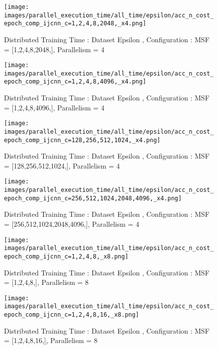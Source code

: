 \begin{figure*}[htbp]
\centering
\texttt{[image: images/parallel\_execution\_time/all\_time/epsilon/acc\_n\_cost\_epoch\_comp\_ijcnn\_c=1,2,4,8,2048,\_x4.png]}
\caption{Distributed Training Time : Dataset Epsilon , Configuration : MSF = [1,2,4,8,2048,], Parallelism = 4}
\label{fig:dis-msf-tr-time-epsilon-x4}
\end{figure*}


\begin{figure*}[htbp]
\centering
\texttt{[image: images/parallel\_execution\_time/all\_time/epsilon/acc\_n\_cost\_epoch\_comp\_ijcnn\_c=1,2,4,8,4096,\_x4.png]}
\caption{Distributed Training Time : Dataset Epsilon , Configuration : MSF = [1,2,4,8,4096,], Parallelism = 4}
\label{fig:dis-msf-tr-time-epsilon-x4}
\end{figure*}


\begin{figure*}[htbp]
\centering
\texttt{[image: images/parallel\_execution\_time/all\_time/epsilon/acc\_n\_cost\_epoch\_comp\_ijcnn\_c=128,256,512,1024,\_x4.png]}
\caption{Distributed Training Time : Dataset Epsilon , Configuration : MSF = [128,256,512,1024,], Parallelism = 4}
\label{fig:dis-msf-tr-time-epsilon-x4}
\end{figure*}


\begin{figure*}[htbp]
\centering
\texttt{[image: images/parallel\_execution\_time/all\_time/epsilon/acc\_n\_cost\_epoch\_comp\_ijcnn\_c=256,512,1024,2048,4096,\_x4.png]}
\caption{Distributed Training Time : Dataset Epsilon , Configuration : MSF = [256,512,1024,2048,4096,], Parallelism = 4}
\label{fig:dis-msf-tr-time-epsilon-x4}
\end{figure*}


\begin{figure*}[htbp]
\centering
\texttt{[image: images/parallel\_execution\_time/all\_time/epsilon/acc\_n\_cost\_epoch\_comp\_ijcnn\_c=1,2,4,8,\_x8.png]}
\caption{Distributed Training Time : Dataset Epsilon , Configuration : MSF = [1,2,4,8,], Parallelism = 8}
\label{fig:dis-msf-tr-time-epsilon-x8}
\end{figure*}


\begin{figure*}[htbp]
\centering
\texttt{[image: images/parallel\_execution\_time/all\_time/epsilon/acc\_n\_cost\_epoch\_comp\_ijcnn\_c=1,2,4,8,16,\_x8.png]}
\caption{Distributed Training Time : Dataset Epsilon , Configuration : MSF = [1,2,4,8,16,], Parallelism = 8}
\label{fig:dis-msf-tr-time-epsilon-x8}
\end{figure*}


